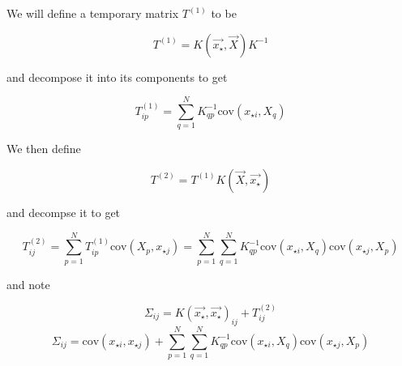 \documentclass[phd,tocprelim]{cornell}
\begin{document}
We will define a temporary matrix $T^{(1)}$ to be

\begin{equation}
 T^{(1)} = K(\vec{x_{\star}}, \vec{X}) K^{-1}
\end{equation}

and decompose it into its components to get

\begin{equation}
 T^{(1)}_{ip} = \sum_{q = 1}^{N} K^{-1}_{qp} \mbox{cov}(x_{\star i}, X_{q})
\end{equation}

We then define

\begin{equation}
 T^{(2)} = T^{(1)} K(\vec{X}, \vec{x_{\star}})
\end{equation}

and decompse it to get

\begin{equation}
 T^{(2)}_{ij} = \sum_{p = 1}^{N} T^{(1)}_{ip} \mbox{cov}(X_{p}, x_{\star j}) = \sum_{p = 1}^{N} \sum_{q = 1}^{N} K^{-1}_{qp} \mbox{cov}(x_{\star i}, X_{q}) \mbox{cov}(x_{\star j}, X_{p})
\end{equation}

and note

\begin{equation}
 \Sigma_{ij} = K(\vec{x_{\star}}, \vec{x_{\star}})_{ij} + T^{(2)}_{ij}
\end{equation}
\begin{equation}
 \Sigma_{ij} = \mbox{cov}(x_{\star i}, x_{\star j}) + \sum_{p = 1}^{N} \sum_{q = 1}^{N} K^{-1}_{qp} \mbox{cov}(x_{\star i}, X_{q}) \mbox{cov}(x_{\star j}, X_{p})
\end{equation}
\end{document}
